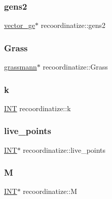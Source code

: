 \subsubsection{\texorpdfstring{gens2}{gens2}}
{\footnotesize\ttfamily \mbox{\hyperlink{classvector__ge}{vector\+\_\+ge}}$\ast$ recoordinatize\+::gens2}

\mbox{\label{classrecoordinatize_aba1ff907c0ca8f0dae8a92e899da87d9}} 
\subsubsection{\texorpdfstring{Grass}{Grass}}
{\footnotesize\ttfamily \mbox{\hyperlink{classgrassmann}{grassmann}}$\ast$ recoordinatize\+::\+Grass}

\mbox{\label{classrecoordinatize_a11e589b124f4ce5fa81019ac2cb34e54}} 
\subsubsection{\texorpdfstring{k}{k}}
{\footnotesize\ttfamily \mbox{\hyperlink{galois_8h_a09fddde158a3a20bd2dcadb609de11dc}{I\+NT}} recoordinatize\+::k}

\mbox{\label{classrecoordinatize_aeb68174bcf3297e6972d2e825cd0a24e}} 
\subsubsection{\texorpdfstring{live\+\_\+points}{live\_points}}
{\footnotesize\ttfamily \mbox{\hyperlink{galois_8h_a09fddde158a3a20bd2dcadb609de11dc}{I\+NT}}$\ast$ recoordinatize\+::live\+\_\+points}

\mbox{\label{classrecoordinatize_a5afb3edbd0364ec3dcaef359c7aba3d7}} 
\subsubsection{\texorpdfstring{M}{M}}
{\footnotesize\ttfamily \mbox{\hyperlink{galois_8h_a09fddde158a3a20bd2dcadb609de11dc}{I\+NT}}$\ast$ recoordinatize\+::M}

